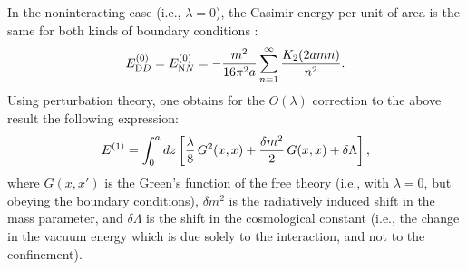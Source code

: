 \documentclass[a4paper,dvips,12pt]{article}
\begin{document}
In the noninteracting case (i.e., $\lambda=0$), 
the Casimir energy per unit
of area is the same for both kinds of boundary 
conditions \cite{AmbjornWolframAP83}: 
%
\begin{equation}
\label{E0}
E_{\textrm DD}^{(0)}=E_{\textrm NN}^{(0)}=-\frac{m^2}{16\pi^2 a}
\sum_{n=1}^{\infty}\frac{K_2(2amn)}{n^2}.
\end{equation}
%
Using perturbation theory, one obtains for the $O(\lambda)$ correction 
to the above result the following expression:
\begin {equation}
\label {Einicial}
E^{(1)}=\int_{0}^{a}dz\left[{\lambda\over 8}\,G^{2}(x,x)
+{\delta m^{2}\over 2}\,G(x,x)+\delta\Lambda\right],
\end {equation}
where $G(x,x')$ is the Green's function of the free theory (i.e.,
with $\lambda=0$, but obeying the boundary conditions),
$\delta m^2$ is the radiatively induced shift in the mass parameter,
and $\delta\Lambda$ is the shift in the cosmological constant (i.e.,
the change in the vacuum energy which is due solely to the
interaction, and not to the confinement).
\end{document}
